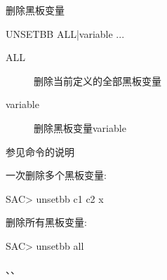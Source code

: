 \label{cmd:unsetbb}

删除黑板变量

\begin{SACSTX}
UNSETBB ALL|variable ...
\end{SACSTX}

\begin{description}
\item [ALL] 删除当前定义的全部黑板变量 
\item [variable] 删除黑板变量variable 
\end{description}

参见命令的说明

一次删除多个黑板变量:
\begin{SACCode}
SAC> unsetbb c1 c2 x
\end{SACCode}

删除所有黑板变量:
\begin{SACCode}
SAC> unsetbb all
\end{SACCode}

、、
